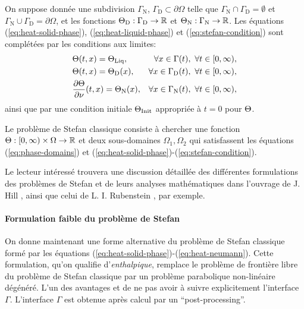 On suppose donnée une subdivision $\Gamma_\mathrm{N}$,
$\Gamma_\mathrm{D}\subset \partial \Omega$ telle que
$\Gamma_\mathrm{N}\cap \Gamma_\mathrm{D} = \emptyset$ et
$\Gamma_\mathrm{N}\cup \Gamma_\mathrm{D} = \partial \Omega$, et les
fonctions $\Theta_\mathrm{D}:\Gamma_\mathrm{D}\to\mathbb R$ et
$\Theta_\mathrm{N}:\Gamma_\mathrm{N}\to\mathbb R$. Les équations
(\ref{eq:heat-solid-phase}), (\ref{eq:heat-liquid-phase}) et
(\ref{eq:stefan-condition}) sont complétées par les conditions aux
limites:
\begin{align}
  &\temperature(t, x) = \tliq, %
  &\forall x \in \Gamma(t),\ \forall t \in [0,\infty),\label{eq:heat-transition}\\
  &\temperature(t, x) = \temperature_\mathrm{D}(x), %
  &\forall x \in \Gamma_\mathrm{D}(t),\ \forall t \in [0,\infty),\label{eq:heat-dirichlet}\\
  &\frac{\partial \temperature}{\partial \nu}(t, x) = \temperature_\mathrm{N}(x), %
  &\forall x \in \Gamma_\mathrm{N}(t),\ \forall t \in [0,\infty),\label{eq:heat-neumann}
\end{align}
ainsi que par une condition initiale $\Theta_\text{Init}$ appropriée à $t = 0$ pour
$\Theta$.

Le problème de Stefan classique consiste à chercher une fonction
$\Theta:[0,\infty)\times\Omega\to\mathbb R$ et deux
  sous-domaines $\Omega_1,\Omega_2$ qui satisfassent les équations
  (\ref{eq:phase-domains}) et
  (\ref{eq:heat-solid-phase})-(\ref{eq:stefan-condition}).

Le lecteur intéressé trouvera une discussion détaillée des différentes
formulations des problèmes de Stefan et de leurs analyses
mathématiques dans l'ouvrage de J. Hill \cite{HillStefanProblems},
ainsi que celui de L. I. Rubenstein \cite{Rubenstein1971}, par
exemple.

\paragraph{Formulation faible du problème de Stefan}
On donne maintenant une forme alternative du problème de Stefan
classique formé par les équations
(\ref{eq:heat-solid-phase})-(\ref{eq:heat-neumann}). Cette
formulation, qu'on qualifie d'{\em enthalpique},
remplace le problème de frontière libre du problème de Stefan
classique par un problème parabolique non-linéaire dégénéré. L'un des
avantages et de ne pas avoir à suivre explicitement l'interface
$\Gamma$. L'interface $\Gamma$ est obtenue après calcul par un
``post-processing''.

